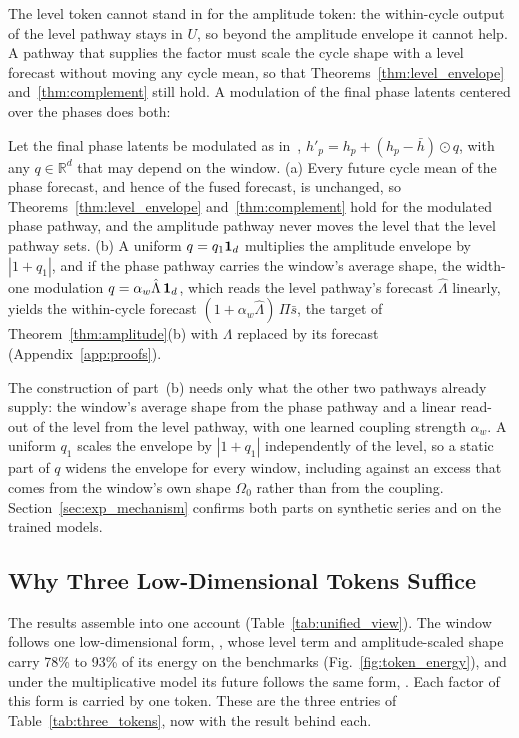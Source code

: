 {
The level token cannot stand in for the amplitude token: the within-cycle output of the level pathway stays in $U$, so beyond the amplitude envelope it cannot help. A pathway that supplies the factor must scale the cycle shape with a level forecast without moving any cycle mean, so that Theorems~\ref{thm:level_envelope} and~\ref{thm:complement} still hold. A modulation of the final phase latents centered over the phases does both:

\begin{proposition}
\label{prop:modulation}
Let the final phase latents be modulated as in~, $h'_p=h_p+(h_p-\bar h)\odot q$, with any $q\in\mathbb R^d$ that may depend on the window.
(a) Every future cycle mean of the phase forecast, and hence of the fused forecast, is unchanged, so Theorems~\ref{thm:level_envelope} and~\ref{thm:complement} hold for the modulated phase pathway, and the amplitude pathway never moves the level that the level pathway sets.
(b) A uniform $q=q_1\mathbf 1_d$ multiplies the amplitude envelope by $|1+q_1|$, and if the phase pathway carries the window's average shape, the width-one modulation $q=\alpha_w\hat\Lambda\,\mathbf 1_d$, which reads the level pathway's forecast $\hat\Lambda$ linearly, yields the within-cycle forecast $(1+\alpha_w\hat\Lambda)\,\Pi\bar s$, the target of Theorem~\ref{thm:amplitude}(b) with $\Lambda$ replaced by its forecast (Appendix~\ref{app:proofs}).
\end{proposition}

The construction of part~(b) needs only what the other two pathways already supply: the window's average shape from the phase pathway and a linear read-out of the level from the level pathway, with one learned coupling strength $\alpha_w$. A uniform $q_1$ scales the envelope by $|1+q_1|$ independently of the level, so a static part of $q$ widens the envelope for every window, including against an excess that comes from the window's own shape $\Omega_0$ rather than from the coupling. Section~\ref{sec:exp_mechanism} confirms both parts on synthetic series and on the trained models.

\subsection{Why Three Low-Dimensional Tokens Suffice}
\label{sec:theory_design}

The results assemble into one account (Table~\ref{tab:unified_view}). The window follows one low-dimensional form, , whose level term and amplitude-scaled shape carry 78\% to 93\% of its energy on the benchmarks (Fig.~\ref{fig:token_energy}), and under the multiplicative model its future follows the same form, . Each factor of this form is carried by one token. These are the three entries of Table~\ref{tab:three_tokens}, now with the result behind each.

}
